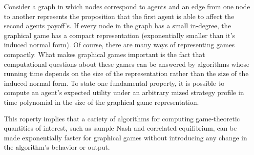 Consider a graph in which nodes correspond to agents and an edge from one node to another represents the proposition that the first agent is able to affect the second agents payoff's. If every node in the graph has a small in-degree, the graphical game has a compact representation (exponentially smaller than it's induced normal form). Of course, there are many ways of representing games compactly. What makes graphical games important is the fact that computational questions about these games can be answered by algorithms whose running time depends on the size of the representation rather than the size of the induced normal form. To state one fundamental property, it is possible to compute an agent's expected utility under an arbitrary mized strategy profile in time polynomial in the size of the graphical game representation. 

This roperty implies that a cariety of algorithms for computing game-theoretic quantities of interest, such as sample Nash and correlated equilibrium, can be made exponentially faster for graphical games without introducing any change in the algorithm's behavior or output.